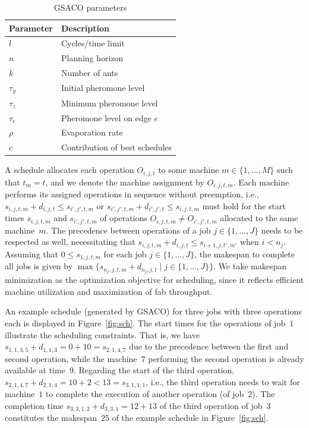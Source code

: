 \documentclass[runningheads]{llncs}
\begin{document}
\begin{table}[t]
	\caption{GSACO parameters}\label{tab:parameters} \centering
	\begin{tabular}{ll}
		\hline
		Parameter & Description \\ \hline
		$l$ & Cycles/time limit        \\
		$n$ & Planning horizon \\
		$k$ & Number of ants \\
		$\tau_{y}$ & Initial pheromone level \\
		$\tau_{z}$ & Minimum pheromone level \\
		$\tau_{e}$ & Pheromone level on edge $e$ \\
		$\rho$ & Evaporation rate \\
		$c$ & Contribution of best schedules \\
		\hline
	\end{tabular}
\end{table}

A schedule allocates each operation $O_{i,j,t}$ to some machine
$m\in\{1,\dots,M\}$ such that $t_m=t$, and we denote the machine
assignment by $O_{i,j,t,m}$.
Each machine performs its assigned operations in sequence without
preemption, i.e.,
$s_{i,j,t,m} + d_{i,j,t} \leq s_{i',j',t,m}$ or
$s_{i',j',t,m} + d_{i',j',t} \leq s_{i,j,t,m}$
must hold for the start times
$s_{i,j,t,m}$ and $s_{i',j',t,m}$ of operations
$O_{i,j,t,m}\neq O_{i',j',t,m}$
allocated to the same machine~$m$.
The precedence between operations of a job $j\in\{1,\dots,J\}$ needs to be
respected as well, necessitating that
$s_{i,j,t,m} + d_{i,j,t} \leq s_{i+1,j,t',m'}$ when $i<n_j$.
Assuming that $0\leq s_{1,j,t,m}$ for each job $j\in\{1,\dots,J\}$,
the makespan to complete all jobs is given by
$\max\{s_{n_j,j,t,m} + d_{n_j,j,t} \mid j\in\{1,\dots,J\}\}$.
We take makespan minimization as the optimization objective for scheduling,
since it reflects efficient machine utilization and
maximization of fab throughput.

An example schedule (generated by GSACO) for three jobs with three
operations each is displayed in Figure~\ref{fig:sch}.
The start times for the operations of job~$1$ illustrate
the scheduling constraints.
That is, we have $s_{1,1,3,5} + d_{1,1,3} = 0 + 10 = s_{2,1,4,7}$
due to the precedence between the first and second operation,
while the machine~$7$ performing the second operation is already available
at time~$9$.
Regarding the start of the third operation,
$s_{2,1,4,7} + d_{2,1,4} = 10 + 2 < 13 = s_{3,1,1,1}$, i.e.,
the third operation needs to wait for machine~$1$ to complete
the execution of another operation (of job~$2$).
The completion time $s_{3,3,1,2} + d_{3,3,1} = 12 + 13$ of the third
operation of job~$3$ constitutes the makespan~$25$ of the example schedule in Figure~\ref{fig:sch}.
\end{document}
